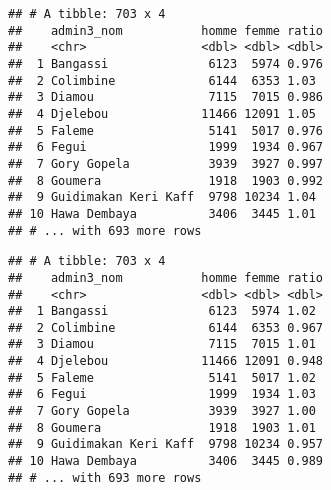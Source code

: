 \documentclass[]{book}
\newenvironment{Shaded}{\begin{snugshade}}{\end{snugshade}}
\newcommand{\KeywordTok}[1]{\textcolor[rgb]{0.13,0.29,0.53}{\textbf{#1}}}
\newcommand{\DataTypeTok}[1]{\textcolor[rgb]{0.13,0.29,0.53}{#1}}
\newcommand{\DecValTok}[1]{\textcolor[rgb]{0.00,0.00,0.81}{#1}}
\newcommand{\StringTok}[1]{\textcolor[rgb]{0.31,0.60,0.02}{#1}}
\newcommand{\CommentTok}[1]{\textcolor[rgb]{0.56,0.35,0.01}{\textit{#1}}}
\newcommand{\OperatorTok}[1]{\textcolor[rgb]{0.81,0.36,0.00}{\textbf{#1}}}
\newcommand{\NormalTok}[1]{#1}
\begin{document}
\begin{Shaded}
\end{Shaded}

\begin{verbatim}
## # A tibble: 703 x 4
##    admin3_nom           homme femme ratio
##    <chr>                <dbl> <dbl> <dbl>
##  1 Bangassi              6123  5974 0.976
##  2 Colimbine             6144  6353 1.03 
##  3 Diamou                7115  7015 0.986
##  4 Djelebou             11466 12091 1.05 
##  5 Faleme                5141  5017 0.976
##  6 Fegui                 1999  1934 0.967
##  7 Gory Gopela           3939  3927 0.997
##  8 Goumera               1918  1903 0.992
##  9 Guidimakan Keri Kaff  9798 10234 1.04 
## 10 Hawa Dembaya          3406  3445 1.01 
## # ... with 693 more rows
\end{verbatim}

\begin{Shaded}
\end{Shaded}

\begin{verbatim}
## # A tibble: 703 x 4
##    admin3_nom           homme femme ratio
##    <chr>                <dbl> <dbl> <dbl>
##  1 Bangassi              6123  5974 1.02 
##  2 Colimbine             6144  6353 0.967
##  3 Diamou                7115  7015 1.01 
##  4 Djelebou             11466 12091 0.948
##  5 Faleme                5141  5017 1.02 
##  6 Fegui                 1999  1934 1.03 
##  7 Gory Gopela           3939  3927 1.00 
##  8 Goumera               1918  1903 1.01 
##  9 Guidimakan Keri Kaff  9798 10234 0.957
## 10 Hawa Dembaya          3406  3445 0.989
## # ... with 693 more rows
\end{verbatim}
\end{document}
